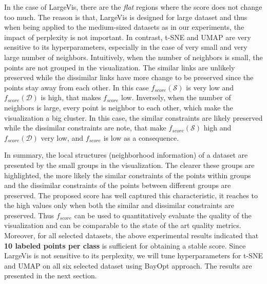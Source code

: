 In the case of LargeVis, there are the \emph{flat} regions where the score does not change too much.
The reason is that, LargeVis is designed for large dataset and thus when being applied to the medium-sized datasets as in our experiments, the impact of perplexity is not important.
In contrast, t-SNE and UMAP are very sensitive to its hyperparameters, especially in the case of very small and very large number of neighbors.
Intuitively, when the number of neighbors is small, the points are not grouped in the visualization.
The similar links are unlikely preserved while the dissimilar links have more change to be preserved since the points stay away from each other.
In this case $f_{score}(\mathcal{S})$ is very low and $f_{score}(\mathcal{D})$ is high, that makes $f_{score}$ low.
Inversely, when the number of neighbors is large, every point is neighbor to each other, which make the visualization a big cluster.
In this case, the similar constraints are likely preserved while the dissimilar constraints are note, that make $f_{score}(\mathcal{S})$ high and $f_{score}(\mathcal{D})$ very low, and $f_{score}$ is low as a consequence.

In summary, the local structures (neighborhood information) of a dataset are presented by the small groups in the visualization.
The clearer these groups are highlighted, the more likely the similar constraints of the points within groups and the dissimilar constraints of the points between different groups are preserved.
The proposed score has well captured this characteristic,  it reaches to the high values only when both the similar and dissimilar constraints are preserved.
Thus $f_{score}$ can be used to quantitatively evaluate the quality of the visualization and can be comparable to the state of the art quality metrics.
Moreover, for all selected datasets, the above experimental results indicated that {\bf 10 labeled points per class} is sufficient for obtaining a stable score.
Since LargeVis is not sensitive to its perplexity, we will tune hyperparameters for t-SNE and UMAP on all six selected dataset using BayOpt approach.
The results are presented in the next section.


